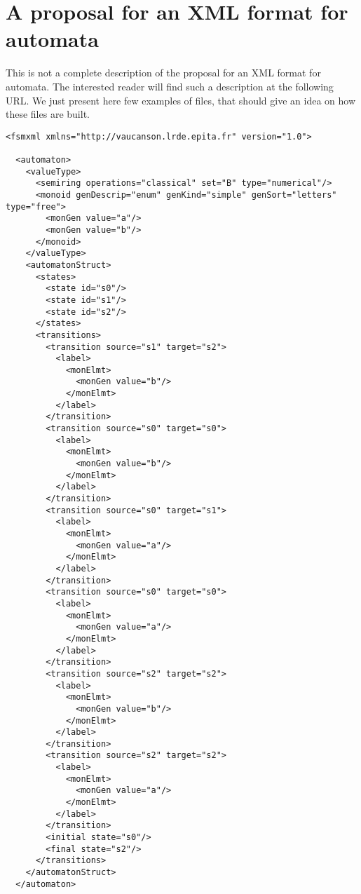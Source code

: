 \chapter{A proposal for an XML format for automata}
\label{sec:xml}

This is not a complete description of the \Vauc proposal for an XML
format for automata.  The interested reader will find such a
description at the following URL.  We just present here few examples
of files, that should give an idea on how these files are built.

\begin{lstlisting}
<fsmxml xmlns="http://vaucanson.lrde.epita.fr" version="1.0">

  <automaton>
    <valueType>
      <semiring operations="classical" set="B" type="numerical"/>
      <monoid genDescrip="enum" genKind="simple" genSort="letters" type="free">
        <monGen value="a"/>
        <monGen value="b"/>
      </monoid>
    </valueType>
    <automatonStruct>
      <states>
        <state id="s0"/>
        <state id="s1"/>
        <state id="s2"/>
      </states>
      <transitions>
        <transition source="s1" target="s2">
          <label>
            <monElmt>
              <monGen value="b"/>
            </monElmt>
          </label>
        </transition>
        <transition source="s0" target="s0">
          <label>
            <monElmt>
              <monGen value="b"/>
            </monElmt>
          </label>
        </transition>
        <transition source="s0" target="s1">
          <label>
            <monElmt>
              <monGen value="a"/>
            </monElmt>
          </label>
        </transition>
        <transition source="s0" target="s0">
          <label>
            <monElmt>
              <monGen value="a"/>
            </monElmt>
          </label>
        </transition>
        <transition source="s2" target="s2">
          <label>
            <monElmt>
              <monGen value="b"/>
            </monElmt>
          </label>
        </transition>
        <transition source="s2" target="s2">
          <label>
            <monElmt>
              <monGen value="a"/>
            </monElmt>
          </label>
        </transition>
        <initial state="s0"/>
        <final state="s2"/>
      </transitions>
    </automatonStruct>
  </automaton>

\end{lstlisting}


